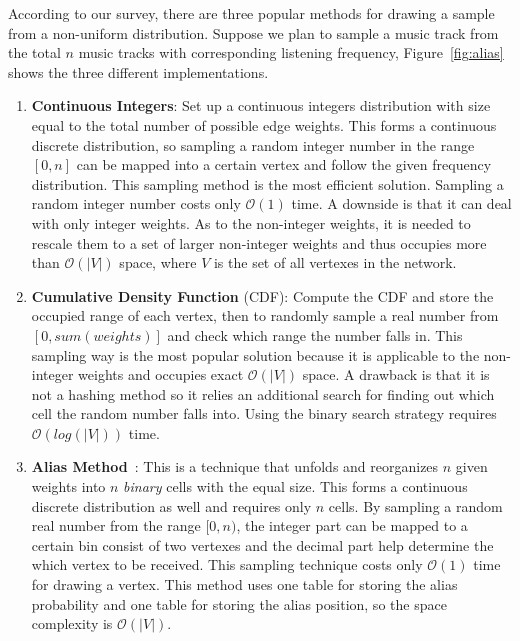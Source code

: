 According to our survey, there are three popular methods for drawing a sample from a non-uniform distribution. Suppose we plan to sample a music track from the total $n$ music tracks with corresponding listening frequency, Figure~\ref{fig:alias} shows the three different implementations.
\begin{enumerate}
  \item \textbf{Continuous Integers}\label{ht}: Set up a continuous integers distribution with size equal to the total number of possible edge weights. This forms a continuous discrete distribution, so sampling a random integer number in the range $[0, n]$ can be mapped into a certain vertex and follow the given frequency distribution.  This sampling method is the most efficient solution. Sampling a random integer number costs only $\mathcal{O}(1)$ time. A downside is that it can deal with only integer weights. As to the non-integer weights, it is needed to rescale them to a set of larger non-integer weights and thus occupies more than $\mathcal{O}(|V|)$ space, where $V$ is the set of all vertexes in the network.

  \item \textbf{Cumulative Density Function} (CDF)\label{cdf}: Compute the CDF and store the occupied range of each vertex, then to randomly sample a real number from $[0, sum(weights)]$ and check which range the number falls in. This sampling way is the most popular solution because it is applicable to the non-integer weights and occupies exact $\mathcal{O}(|V|)$ space. A drawback is that it is not a hashing method so it relies an additional search for finding out which cell the random number falls into. Using the binary search strategy requires $\mathcal{O}(log(|V|))$ time.

  \item \textbf{Alias Method}\label{al}~\cite{alias}: This is a technique that unfolds and reorganizes $n$ given weights into $n$ \textit{binary} cells with the equal size. This forms a continuous discrete distribution as well and requires only $n$ cells. By sampling a random real number from the range $[0, n)$, the integer part can be mapped to a certain bin consist of two vertexes and the decimal part help determine the which vertex to be received. This sampling technique costs only $\mathcal{O}(1)$ time for drawing a vertex.  This method uses one table for storing the alias probability and one table for storing the alias position, so the space complexity is $\mathcal{O}(|V|)$. 
\end{enumerate}



